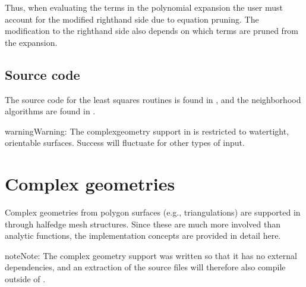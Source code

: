 \documentclass[letterpaper,10pt,english]{sphinxmanual}
\begin{document}
Thus, when evaluating the terms in the polynomial expansion the user must account for the modified right\sphinxhyphen{}hand side due to equation pruning.
The modification to the right\sphinxhyphen{}hand side also depends on which terms are pruned from the expansion.


\subsection{Source code}
\label{\detokenize{Utilities/LeastSquares:source-code}}
The source code for the least squares routines is found in , and the neighborhood algorithms are found in .

\begin{sphinxadmonition}{warning}{Warning:}
The complex\sphinxhyphen{}geometry support in  is restricted to watertight, orientable surfaces.
Success will fluctuate for other types of input.
\end{sphinxadmonition}


\section{Complex geometries}
\label{\detokenize{Utilities/ComplexGeometries:complex-geometries}}\label{\detokenize{Utilities/ComplexGeometries:chap-complexgeometries}}\label{\detokenize{Utilities/ComplexGeometries::doc}}
Complex geometries from polygon surfaces (e.g., triangulations) are supported in  through half\sphinxhyphen{}edge mesh structures.
Since these are much more involved than analytic functions, the implementation concepts are provided in detail here.

\begin{sphinxadmonition}{note}{Note:}
The complex geometry support was written so that it has no external dependencies, and an extraction of the source files will therefore also compile outside of .
\end{sphinxadmonition}
\end{document}
